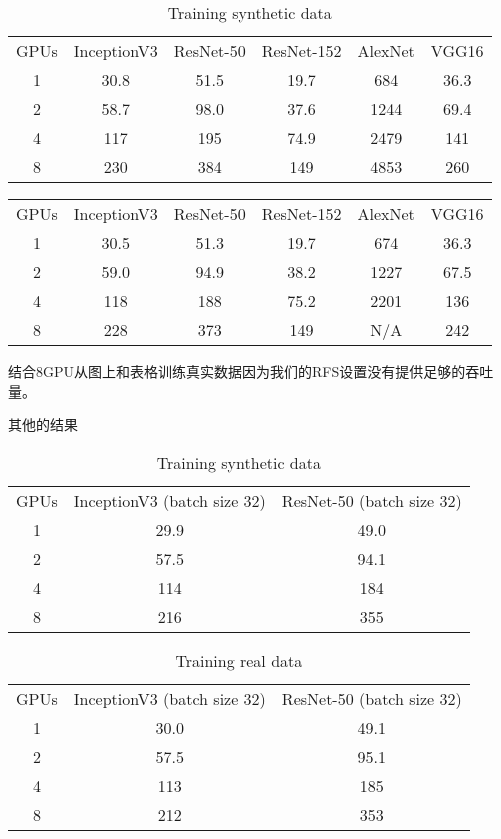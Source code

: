  \begin{table}[H]
	\begin{tabular}{|c|c|c|c|c|c|}
		GPUs	&InceptionV3	&ResNet-50	&ResNet-152	&AlexNet	&VGG16\\
		1	&30.8	&51.5	&19.7	&684	&36.3\\
		2	&58.7	&98.0	&37.6	&1244	&69.4\\
		4	&117	&195	&74.9	&2479	&141\\
		8	&230	&384	&149	&4853	&260\\
	\end{tabular}
	 \caption{Training synthetic data}
\end{table}
 \begin{table}[H]
	 \begin{tabular}{|c|c|c|c|c|c|}
		 GPUs	&InceptionV3	&ResNet-50	&ResNet-152	&AlexNet	&VGG16\\
		 1	&30.5	&51.3	&19.7	&674	&36.3\\
		 2	&59.0	&94.9	&38.2	&1227	&67.5\\
		 4	&118	&188	&75.2	&2201	&136\\
		 8	&228	&373	&149	&N/A	&242\\
	 \end{tabular}
 \end{table}
 结合8GPU从图上和表格训练真实数据因为我们的RFS设置没有提供足够的吞吐量。
 
 其他的结果
 \begin{table}[H]
	\begin{tabular}{|c|c|c|}
		GPUs	&InceptionV3 (batch size 32)	&ResNet-50 (batch size 32)\\
		1	&29.9	&49.0\\
		2	&57.5	&94.1\\
		4	&114	&184\\
		8	&216	&355\\
	\end{tabular}
	 \caption{Training synthetic data}
\end{table}
 \begin{table}[H]
	\begin{tabular}{|c|c|c|}
		GPUs	&InceptionV3 (batch size 32)	&ResNet-50 (batch size 32)\\
		1	&30.0	&49.1\\
		2	&57.5	&95.1\\
		4	&113	&185\\
		8	&212	&353\\
	\end{tabular}
	 \caption{Training real data}
\end{table}
